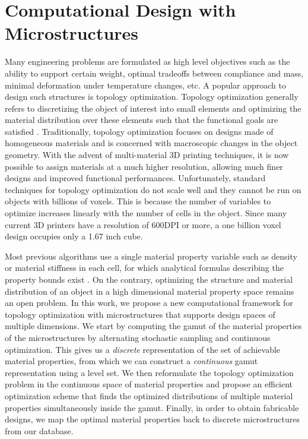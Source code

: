 \chapter{Computational Design with Microstructures}
\label{ch3:topopt}
Many engineering problems are formulated as high level objectives such as the ability to support certain weight, optimal tradeoffs between compliance and mass, minimal deformation under temperature changes, etc. A popular approach to design such structures is topology optimization.
Topology optimization generally refers to discretizing the object of interest into small elements and optimizing the material distribution over these elements such that the functional goals are satisfied \cite{bendsoe2004topology}.
Traditionally, topology optimization focuses on designs made of homogeneous materials and is concerned with macroscopic changes in the object geometry.
With the advent of multi-material 3D printing techniques, it is now possible to assign materials at a much higher resolution, allowing much finer designs and improved functional performances.
Unfortunately, standard techniques for topology optimization do not scale well and they cannot be run on objects with billions of voxels.
This is because the number of variables to optimize increases linearly with the number of cells in the object.
Since many current 3D printers have a resolution of 600DPI or more, a one billion voxel design occupies only a 1.67 inch cube.

Most previous algorithms use a single material property variable such as density or material stiffness in each cell,
for which analytical formulas describing the property bounds exist \cite{Allaire93Bounds}.
On the contrary, optimizing the structure and material distribution of an object in a high dimensional material property space remains an open problem.
In this work, we propose a new computational framework for topology optimization with microstructures that supports design spaces of multiple dimensions.
We start by computing the gamut of the material properties of the microstructures by alternating stochastic sampling and continuous optimization.
This gives us a {\it discrete} representation of the set of achievable material properties, 
from which we can construct a {\it continuous} gamut representation using a level set.
We then reformulate the topology optimization problem in the continuous space of material properties and propose an efficient optimization scheme that finds the optimized distributions of multiple material properties simultaneously inside the gamut.
Finally, in order to obtain fabricable designs, we map the optimal material properties back to discrete microstructures from our database.

